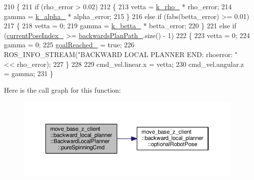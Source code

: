 \begin{DoxyCode}
210 \{
211     \textcolor{keywordflow}{if} (rho\_error > 0.02)
212     \{
213         vetta = \hyperlink{classmove__base__z__client_1_1backward__local__planner_1_1BackwardLocalPlanner_a9ae9a8c4c4663a999ba107aea9f6868d}{k\_rho\_} * rho\_error;
214         gamma = \hyperlink{classmove__base__z__client_1_1backward__local__planner_1_1BackwardLocalPlanner_ac859500c0329247de08daf864fd2d4b1}{k\_alpha\_} * alpha\_error;
215     \}
216     \textcolor{keywordflow}{else} \textcolor{keywordflow}{if} (fabs(betta\_error) >= 0.01)
217     \{
218         vetta = 0;
219         gamma = \hyperlink{classmove__base__z__client_1_1backward__local__planner_1_1BackwardLocalPlanner_aa2f7fe022cdc4eb11c17f6f576c732c6}{k\_betta\_} * betta\_error;
220     \}
221     \textcolor{keywordflow}{else} \textcolor{keywordflow}{if} (\hyperlink{classmove__base__z__client_1_1backward__local__planner_1_1BackwardLocalPlanner_af304b2e7cde744ad905a1ae7889102b6}{currentPoseIndex\_} >= \hyperlink{classmove__base__z__client_1_1backward__local__planner_1_1BackwardLocalPlanner_a451add2af7d6d83a7415277311b3ed04}{backwardsPlanPath\_}.size() - 1)
222     \{
223         vetta = 0;
224         gamma = 0;
225         \hyperlink{classmove__base__z__client_1_1backward__local__planner_1_1BackwardLocalPlanner_a0a89141d3d3a8ebfb9e1d69d0d33fd49}{goalReached\_} = \textcolor{keyword}{true};
226         ROS\_INFO\_STREAM(\textcolor{stringliteral}{"BACKWARD LOCAL PLANNER END: rhoerror: "} << rho\_error);
227     \}
228 
229     cmd\_vel.linear.x = vetta;
230     cmd\_vel.angular.z = gamma;
231 \}
\end{DoxyCode}


Here is the call graph for this function\+:\nopagebreak
\begin{figure}[H]
\begin{center}
\leavevmode
\includegraphics[width=350pt]{classmove__base__z__client_1_1backward__local__planner_1_1BackwardLocalPlanner_a3b08865dc8e19750273d971336ecba3b_cgraph}
\end{center}
\end{figure}




